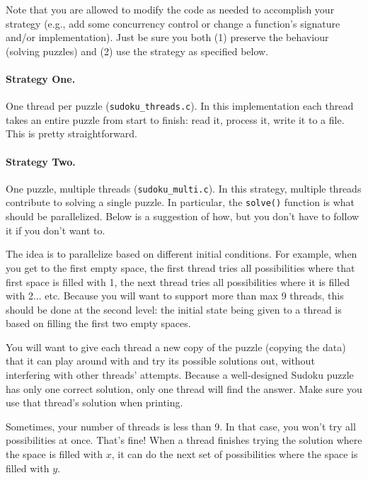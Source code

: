 \documentclass[letterpaper,10pt]{article}
\begin{document}
Note that you are allowed to 
modify the code as needed to accomplish your strategy (e.g., add some
concurrency control or change a function's signature and/or implementation).
Just be sure you both (1) preserve the behaviour (solving puzzles) and
(2) use the strategy as specified below.

\paragraph{Strategy One.}
One thread per puzzle (\texttt{sudoku\_threads.c}). In this implementation 
each thread takes an entire puzzle from start to finish: read it, process it, 
write it to a file. This is pretty straightforward.

\paragraph{Strategy Two.}

One puzzle, multiple threads (\texttt{sudoku\_multi.c}). In this strategy, 
multiple threads contribute to solving a single puzzle. In particular, 
the \texttt{solve()} function is what should be parallelized.
Below is a suggestion of how, but you don't have to follow it if you
don't want to.  


The idea is to parallelize based on different initial conditions. 
For example, when you get to the first
empty space, the first thread tries all possibilities where that first
space is filled with 1, the next thread tries all possibilities where 
it is filled with 2... etc.
Because you will want to support more than max 9 threads, this should be
done at the second level: the initial state being given to a
thread is based on filling the first two empty spaces. 

You will want to give each thread a new copy of
the puzzle (copying the data) that it can play around with and try its 
possible solutions out, without interfering with other threads' attempts.
Because a well-designed Sudoku puzzle has only one 
correct solution, only one thread will find the answer. Make sure 
you use that thread's solution when printing.

Sometimes, your number of threads is less than 9. In that case,
you won't try all possibilities at once. That's fine! When a thread finishes
trying the solution where the space is filled with $x$, it can do the 
next set of possibilities where the space is filled with $y$.
\end{document}
